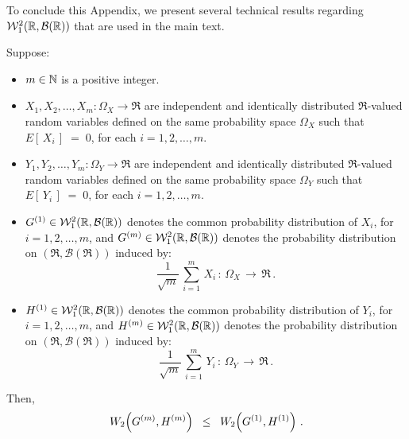 \vskip 0.3cm
\noindent
To conclude this Appendix, we present several technical results regarding $\mathcal{W}^{2}_{1}\!\left(\mathbb{R},\mathcal{B}(\mathbb{R})\right)$
that are used in the main text.

\begin{lemma}
\mbox{}\vskip 0.1cm
\noindent
Suppose:
\begin{itemize}
\item
	$m \in \mathbb{N}$ is a positive integer.
\item
	$X_{1}, X_{2}, \ldots, X_{m} : \Omega_{X} \longrightarrow \Re$
	are independent and identically distributed $\Re$-valued random variables
	defined on the same probability space $\Omega_{X}$ such that
	$E\!\left[\,X_{i}\,\right] \; = \; 0$, for each $i = 1, 2, \ldots, m$.

\item
	$Y_{1}, Y_{2}, \ldots, Y_{m} : \Omega_{Y} \longrightarrow \Re$
	are independent and identically distributed $\Re$-valued random variables
	defined on the same probability space $\Omega_{Y}$ such that
	$E\!\left[\,Y_{i}\,\right] \; = \; 0$, for each $i = 1, 2, \ldots, m$.
\item
	$G^{(1)} \in \mathcal{W}^{2}_{1}\!\left(\mathbb{R},\mathcal{B}(\mathbb{R})\right)$ denotes the common probability distribution of $X_{i}$, for $i = 1, 2, \ldots, m$, and
	$G^{(m)} \in \mathcal{W}^{2}_{1}\!\left(\mathbb{R},\mathcal{B}(\mathbb{R})\right)$ denotes the probability distribution
	on $(\Re,\mathcal{B}(\Re))$ induced by:
	\begin{equation*}
	\dfrac{1}{\sqrt{m}}\,\sum^{m}_{i=1}\,X_{i}\,:\,\Omega_{X}\,\longrightarrow\,\Re\,.
	\end{equation*}
\item
	$H^{(1)} \in \mathcal{W}^{2}_{1}\!\left(\mathbb{R},\mathcal{B}(\mathbb{R})\right)$ denotes the common probability distribution of $Y_{i}$, for $i = 1, 2, \ldots, m$, and
	$H^{(m)} \in \mathcal{W}^{2}_{1}\!\left(\mathbb{R},\mathcal{B}(\mathbb{R})\right)$ denotes the probability distribution
	on $(\Re,\mathcal{B}(\Re))$ induced by:
	\begin{equation*}
	\dfrac{1}{\sqrt{m}}\,\sum^{m}_{i=1}\,Y_{i}\,:\,\Omega_{Y}\,\longrightarrow\,\Re\,.
	\end{equation*}
\end{itemize}
Then,
\begin{equation*}
W_{2}\!\left(G^{(m)},H^{(m)}\right)
\;\;\leq\;\;
W_{2}\!\left(G^{(1)},H^{(1)}\right)\,.
\end{equation*}
\end{lemma}

